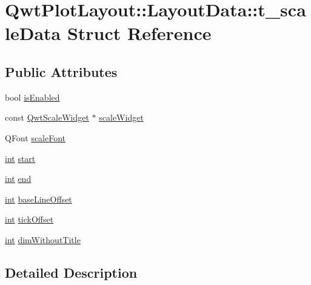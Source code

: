 \hypertarget{struct_qwt_plot_layout_1_1_layout_data_1_1t__scale_data}{\section{Qwt\-Plot\-Layout\-:\-:Layout\-Data\-:\-:t\-\_\-scale\-Data Struct Reference}
\label{struct_qwt_plot_layout_1_1_layout_data_1_1t__scale_data}
}
\subsection*{Public Attributes}
\begin{DoxyCompactItemize}
\item 
bool \hyperlink{struct_qwt_plot_layout_1_1_layout_data_1_1t__scale_data_acf8738d1152927c7ef3d167e04693632}{is\-Enabled}
\item 
const \hyperlink{class_qwt_scale_widget}{Qwt\-Scale\-Widget} $\ast$ \hyperlink{struct_qwt_plot_layout_1_1_layout_data_1_1t__scale_data_a541cab444de6f42c9ac735c0099e87d1}{scale\-Widget}
\item 
Q\-Font \hyperlink{struct_qwt_plot_layout_1_1_layout_data_1_1t__scale_data_af0f66230fb3f9d60b2251ebbef56919a}{scale\-Font}
\item 
\hyperlink{ioapi_8h_a787fa3cf048117ba7123753c1e74fcd6}{int} \hyperlink{struct_qwt_plot_layout_1_1_layout_data_1_1t__scale_data_accbeb074269039ebd7975ebcee56dc95}{start}
\item 
\hyperlink{ioapi_8h_a787fa3cf048117ba7123753c1e74fcd6}{int} \hyperlink{struct_qwt_plot_layout_1_1_layout_data_1_1t__scale_data_a2fdfe39b4a59e6f6688959e3f3161398}{end}
\item 
\hyperlink{ioapi_8h_a787fa3cf048117ba7123753c1e74fcd6}{int} \hyperlink{struct_qwt_plot_layout_1_1_layout_data_1_1t__scale_data_a6160b71adee73ddc3a7a39774ed70979}{base\-Line\-Offset}
\item 
\hyperlink{ioapi_8h_a787fa3cf048117ba7123753c1e74fcd6}{int} \hyperlink{struct_qwt_plot_layout_1_1_layout_data_1_1t__scale_data_a1206f6357152ae0f7725e25c8443b263}{tick\-Offset}
\item 
\hyperlink{ioapi_8h_a787fa3cf048117ba7123753c1e74fcd6}{int} \hyperlink{struct_qwt_plot_layout_1_1_layout_data_1_1t__scale_data_a8e5474f10631c953333a08ffc8605fed}{dim\-Without\-Title}
\end{DoxyCompactItemize}


\subsection{Detailed Description}


